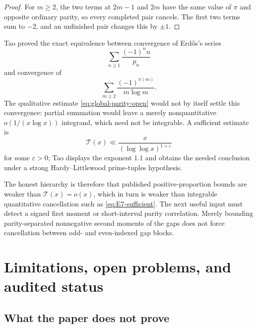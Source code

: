 \documentclass[11pt]{article}
\theoremstyle{definition}
\theoremstyle{remark}
\newcommand{\eps}{\varepsilon}
\begin{document}
\begin{proof}
For $m\ge2$, the two terms at $2m-1$ and $2m$ have the same value of $\pi$ and
opposite ordinary parity, so every completed pair cancels.  The first two terms sum to
$-2$, and an unfinished pair changes this by $\pm1$.
\end{proof}

Tao \cite{TaoErdos} proved the exact equivalence between convergence of Erd\H{o}s's
series
\begin{equation}\label{eq:Erdos-series}
 \sum_{n\ge1}\frac{(-1)^n n}{p_n}
\end{equation}
and convergence of
\begin{equation}\label{eq:Tao-reduced-series}
 \sum_{m\ge2}\frac{(-1)^{\pi(m)}}{m\log m}.
\end{equation}
The qualitative estimate \eqref{eq:global-parity-open} would not by itself settle this
convergence: partial summation would leave a merely nonquantitative $o(1/(x\log x))$
integrand, which need not be integrable.  A sufficient estimate is
\begin{equation}\label{eq:E7-sufficient}
 \mathcal T(x)\ll
 \frac{x}{(\log\log x)^{1+\eps}}
\end{equation}
for some $\eps>0$; Tao displays the exponent $1.1$ and obtains the needed conclusion
under a strong Hardy--Littlewood prime-tuples hypothesis.

The honest hierarchy is therefore that published positive-proportion bounds are weaker
than $\mathcal T(x)=o(x)$, which in turn is weaker than integrable quantitative
cancellation such as \eqref{eq:E7-sufficient}.
The next useful input must detect a signed first moment or short-interval parity
correlation.  Merely bounding parity-separated nonnegative second moments of the gaps
does not force cancellation between odd- and even-indexed gap blocks.

\section{Limitations, open problems, and audited status}

\subsection{What the paper does not prove}
\end{document}
